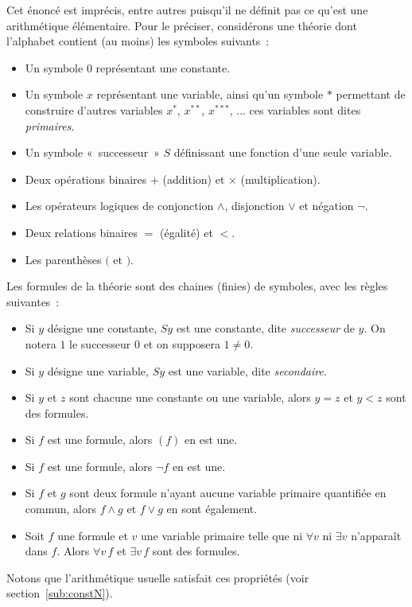 \noindent Cet énoncé est imprécis, entre autres puisqu'il ne définit pas ce qu'est une arithmétique élémentaire. 
Pour le préciser, considérons une théorie dont l'alphabet contient (au moins) les symboles suivants : 
\begin{itemize}[nosep]
    \item Un symbole $0$ représentant une constante. 
    \item Un symbole $x$ représentant une variable, ainsi qu'un symbole $\ast$ permettant de construire d'autres variables $x^\ast$, $x^{\ast\ast}$, $x^{\ast\ast\ast}$, ... ces variables sont dites \emph{primaires}.
    \item Un symbole « successeur » $S$ définissant une fonction d'une seule variable. 
    \item Deux opérations binaires $+$ (addition) et $\times$ (multiplication).
    \item Les opérateurs logiques de conjonction $\wedge$, disjonction $\vee$ et négation $\neg$.
    \item Deux relations binaires $=$ (égalité) et $<$.
    \item Les parenthèses $($ et $)$.
\end{itemize}

Les formules de la théorie sont des chaines (finies) de symboles, avec les règles suivantes : 
\begin{itemize}[nosep]
    \item Si $y$ désigne une constante, $S y$ est une constante, dite \textit{successeur} de $y$. 
        On notera $1$ le successeur $0$ et on supposera $1 \neq 0$.
    \item Si $y$ désigne une variable, $S y$ est une variable, dite \emph{secondaire}.
    \item Si $y$ et $z$ sont chacune une constante ou une variable, alors $y = z$ et $y < z$ sont des formules.
    \item Si $f$ est une formule, alors $(f)$ en est une. 
    \item Si $f$ est une formule, alors $\neg f$ en est une. 
    \item Si $f$ et $g$ sont deux formule n'ayant aucune variable primaire quantifiée en commun, alors $f \wedge g$ et $f \vee g$ en sont également. 
    \item Soit $f$ une formule et $v$ une variable primaire telle que ni $\forall v$ ni $\exists v$ n'apparaît dans $f$. 
        Alors $\forall v \, f$ et $\exists v \, f$ sont des formules.
\end{itemize}
Notons que l'arithmétique usuelle satisfait ces propriétés (voir section~\ref{sub:constN}).


